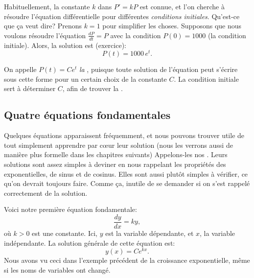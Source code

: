 Habituellement, la constante $k$ dans $P' = kP$ est connue, et l'on cherche à résoudre l'équation différentielle pour différentes \emph{conditions initiales}.  Qu'est-ce que \c{c}a veut dire?  Prenons $k=1$ pour simplifier les choses.  Supposons que nous voulons résoudre l'équation 
$\frac{dP}{dt} = P$ 
avec la condition $P(0) = 1000$ (la condition initiale).
Alors, la solution est (exercice): 
\begin{equation*}
P(t) = 1000 \, e^t .
\end{equation*}

On appelle $P(t) = C e^t$ \emph{la },
puisque toute solution de l'équation peut s'écrire sous cette forme pour un certain choix de la constante $C$.  La condition initiale sert à déterminer $C$, afin de trouver la 
\emph{}.  

\subsection{Quatre équations fondamentales} \label{subsection:fourfundamental}

Quelques équations apparaissent fréquemment, et nous pouvons trouver utile de tout simplement apprendre par c{\oe}ur leur solution (nous les verrons aussi de manière plus formelle dans les chapitres suivants)  Appelons-les nos . Leurs solutions sont assez simples à deviner en nous rappelant les propriétés des exponentielles, de sinus et de cosinus.  Elles sont aussi plutôt simples à vérifier, ce qu'on devrait toujours faire.  Comme \c{c}a, inutile de se demander si on s'est rappelé correctement de la solution.

\medskip

Voici notre première équation fondamentale: 
\begin{equation*}
	\frac{dy}{dx} = k y,
\end{equation*}
où $k > 0$ est une constante.
Ici, $y$ est la variable dépendante, et $x$, la variable indépendante.
La solution générale de cette équation est: 
\begin{equation*}
	y(x) = C e^{kx} .
\end{equation*}
Nous avons vu ceci dans l'exemple précédent de la croissance exponentielle, même si les noms de variables ont changé.

\medskip


